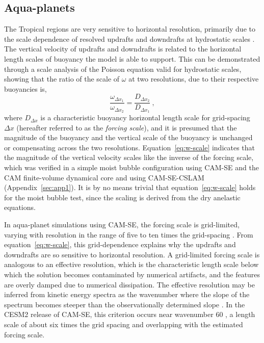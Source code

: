 \documentclass{agujournal}
\begin{document}
\subsection{Aqua-planets}\label{sec:aquaplanet}

The Tropical regions are very sensitive to horizontal resolution, primarily due to the scale dependence of resolved updrafts and downdrafts at hydrostatic scales \citep{HR2017JCLIM,HR2018JAMES}. The vertical velocity of updrafts and downdrafts is related to the horizontal length scales of buoyancy the model is able to support. This can be demonstrated through a scale analysis of the Poisson equation \citep{JR2016QJRMS} valid for hydrostatic scales, showing that the ratio of the scale of $\omega$ at two resolutions, due to their respective buoyancies is,
\begin{equation}
\frac{\omega_{\Delta x_1}}{\omega_{\Delta x_2}} =  \frac{D_{\Delta x_2}}{D_{\Delta x_1}}~,\label{eq:w-scale}
\end{equation}
where $D_{\Delta x}$ is a characteristic buoyancy horizontal length scale for grid-spacing $\Delta x$ (hereafter referred to as the {\em{forcing scale}}), and it is presumed that the magnitude of the buoyancy and the vertical scale of the buoyancy is unchanged or compensating across the two resolutions. Equation~\ref{eq:w-scale} indicates that the magnitude of the vertical velocity scales like the inverse of the forcing scale, which was verified in a simple moist bubble configuration using CAM-SE and the CAM finite-volume dynamical core \citep{HR2018JAMES} and using CAM-SE-CSLAM (Appendix~\ref{sec:app1}). It is by no means trivial that equation~\ref{eq:w-scale} holds for the moist bubble test, since the scaling is derived from the dry anelastic equations.

In aqua-planet simulations using CAM-SE, the forcing scale is grid-limited, varying with resolution in the range of five to ten times the grid-spacing \citep{HR2018JAMES}. From equation~\ref{eq:w-scale}, this grid-dependence explains why the updrafts and downdrafts are so sensitive to horizontal resolution. A grid-limited forcing scale is analogous to an effective resolution, which is the characteristic length scale below which the solution becomes contaminated by numerical artifacts, and the features are overly damped due to numerical dissipation. The effective resolution may be inferred from kinetic energy spectra as the wavenumber where the slope of the spectrum becomes steeper than the observationally determined slope \citep{S2011LNCSE}. In the CESM2 release of CAM-SE, this criterion occurs near wavenumber 60 \citep[see Figure 6 in][]{LetAl2018JAMES}, a length scale of about six times the grid spacing and overlapping with the estimated forcing scale.
\end{document}
